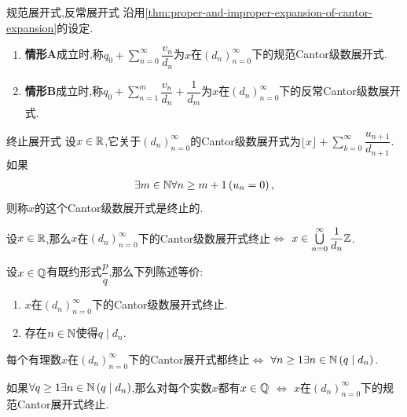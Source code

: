 \begin{definition}{规范展开式,反常展开式}{}
	沿用\cref{thm:proper-and-improper-expansion-of-cantor-expansion}的设定.
	\begin{enumerate}
		\item \textbf{情形A}成立时,称$q_{0}+\sum\limits_{n=0}^{\infty}\dfrac{v_{n}}{d_{n}}$为$x$在$\left(d_{n}\right)_{n=0}^{\infty}$下的规范Cantor级数展开式.
		\item \textbf{情形B}成立时,称$q_{0}+\sum\limits_{n=1}^{m}\dfrac{v_{n}}{d_{n}}+\dfrac{1}{d_{m}}$为$x$在$\left(d_{n}\right)_{n=0}^{\infty}$下的反常Cantor级数展开式.
	\end{enumerate}
\end{definition}

\begin{definition}{终止展开式}{}
	设$x\in\mathbb{R}$,它关于$\left(d_{n}\right)_{n=0}^{\infty}$的Cantor级数展开式为$\lfloor x\rfloor+\sum\limits_{k=0}^{\infty}\dfrac{u_{n+1}}{d_{n+1}}$.如果
	\begin{align*}
		\exists m\in\mathbb{N}\forall n\geq m+1\left(u_{n}=0\right),
	\end{align*}
	则称$x$的这个Cantor级数展开式是终止的.
\end{definition}

\begin{corollary}{}{}
	设$x\in\mathbb{R}$,那么$x$在$\left(d_{n}\right)_{n=0}^{\infty}$下的Cantor级数展开式终止$\iff$ $x\in\bigcup\limits_{n=0}^{\infty}\dfrac{1}{d_{n}}\mathbb{Z}$.
\end{corollary}

\begin{proposition}{}{}
	设$x\in\mathbb{Q}$有既约形式$\dfrac{p}{q}$,那么下列陈述等价:
	\begin{enumerate}
		\item $x$在$\left(d_{n}\right)_{n=0}^{\infty}$下的Cantor级数展开式终止.
		\item 存在$n\in\mathbb{N}$使得$q\mid d_{n}$.
	\end{enumerate}
\end{proposition}

\begin{proposition}{}{}
	每个有理数$x$在$\left(d_{n}\right)_{n=0}^{\infty}$下的Cantor展开式都终止$\iff$ $\forall n\geq 1\exists n\in\mathbb{N}\left(q\mid d_{n}\right)$.
\end{proposition}

\begin{corollary}{}{}
	如果$\forall q\geq 1\exists n\in\mathbb{N}\left(q\mid d_{n}\right)$,那么对每个实数$x$都有$x\in\mathbb{Q}$ $\iff$ $x$在$\left(d_{n}\right)_{n=0}^{\infty}$下的规范Cantor展开式终止.
\end{corollary}

